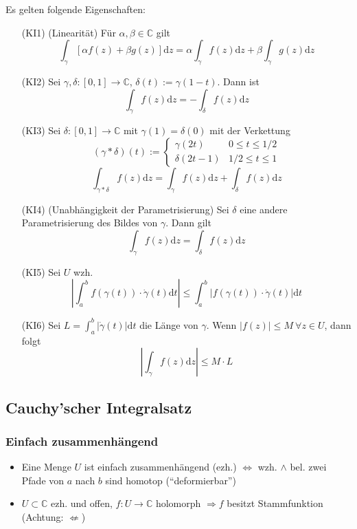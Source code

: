 \documentclass[8pt, a4paper, landscape, fleqn]{scrartcl}
\def\C{\mathbb{C}}
\def\d{\text{d}}
\newcommand{\blue}[1]{\textcolor{ethblue}{#1}}
\begin{document}
\begin{multicols*}{3}
        Es gelten folgende Eigenschaften:
    	\begin{itemize}[leftmargin=1cm]
          \item[(KI1)] (Linearität) Für $\alpha, \beta \in\C$ gilt $$\int_\gamma [\alpha f(z) + \beta g(z)]\d z = \alpha \int_\gamma f(z)\d z + \beta \int_\gamma g(z)\d z$$
          \item[(KI2)] Sei $\gamma, \delta : [0, 1]\to\C$, $\delta(t) := \gamma(1-t)$. Dann ist $$\int_\gamma f(z)\d z = -\int_\delta f(z)\d z $$
          \item[(KI3)] Sei $\delta : [0, 1]\to\C$ mit $\gamma(1) = \delta(0)$ mit der Verkettung $$(\gamma * \delta)(t) := \begin{cases}
          \gamma(2t) & 0 \leq t \leq 1/2 \\ \delta(2t-1) & 1/2 \leq t \leq 1
          \end{cases} $$ $$ \int_{\gamma*\delta}f(z)\d z = \int_\gamma f(z)\d z + \int_\delta f(z) \d z$$
          \item[(KI4)] (Unabhängigkeit der Parametrisierung) Sei $\delta$ eine andere Parametrisierung des Bildes von $\gamma$. Dann gilt $$ \int_\gamma f(z)\d z = \int_\delta f(z)\d z $$
          \item[(KI5)] Sei $U$ wzh. $$\left\vert \int_a^b f(\gamma(t)) \cdot \dot{\gamma}(t) \d t \right\vert \leq \int_a^b \vert f(\gamma(t)) \cdot \dot{\gamma}(t)\vert \d t$$
          \item[(KI6)] Sei $L = \int_a^b \vert \dot{\gamma}(t)\vert\d t$ die Länge von $\gamma$. Wenn $\vert f(z) \vert \leq M\ \forall z \in U$, dann folgt $$ \left\vert \int_\gamma f(z)\d z \right\vert \leq M\cdot L $$
        \end{itemize}
        
        
        
        \subsection{Cauchy'scher Integralsatz}
        \subsubsection{Einfach zusammenhängend}
        \begin{itemize}
            \item Eine Menge $U$ ist \blue{einfach zusammenhängend (ezh.)} $\Leftrightarrow$ wzh. $\land$ bel. zwei Pfade von $a$ nach $b$ sind homotop (``deformierbar'')
            \item $U \subset \C$ ezh. und offen, $f: U \to \C$ holomorph $\Rightarrow f$ besitzt Stammfunktion (Achtung: $\not\Leftarrow$)
        \end{itemize}

\end{multicols*}
\end{document}
